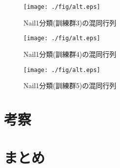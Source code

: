 		\begin{figure}[htbp]
			\begin{center}
			  \texttt{[image: ./fig/alt.eps]}
			  \caption{Nail1分類(訓練群3)の混同行列}
			  \label{fig:3_2}
			\end{center}
		\end{figure}

		\begin{figure}[htbp]
			\begin{center}			  
			  \texttt{[image: ./fig/alt.eps]}
			  \caption{Nail1分類(訓練群4)の混同行列}
			  \label{fig:3_2}
			\end{center}
		\end{figure}

		\begin{figure}[htbp]
			\begin{center}			  			  
			  \texttt{[image: ./fig/alt.eps]}
			  \caption{Nail1分類(訓練群5)の混同行列}
			  \label{fig:3_2}
			\end{center}
		\end{figure}


\section{考察}

\section{まとめ}

